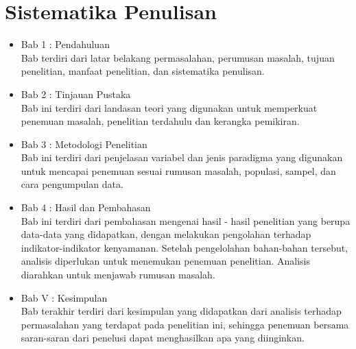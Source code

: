 \documentclass[12pt,oneside]{udthesis}\usepackage[]{graphicx}\usepackage[]{color}
\begin{document}
\section{Sistematika Penulisan}
\lipsum[1-1]
\begin{itemize}
	\item Bab 1 : Pendahuluan\\
Bab terdiri dari latar belakang permasalahan, perumusan masalah, tujuan penelitian, manfaat penelitian, dan sistematika penulisan.
	\item Bab 2 : Tinjauan Pustaka\\
Bab ini terdiri dari landasan teori yang digunakan untuk memperkuat penemuan masalah, penelitian terdahulu dan kerangka pemikiran.
	\item Bab 3 : Metodologi Penelitian\\
Bab ini terdiri dari penjelasan variabel dan jenis paradigma yang digunakan untuk mencapai penemuan sesuai rumusan masalah, populasi, sampel, dan cara pengumpulan data.
	\item Bab 4 : Hasil dan Pembahasan\\
Bab ini terdiri dari pembahasan mengenai hasil - hasil penelitian yang berupa data-data yang didapatkan, dengan melakukan pengolahan terhadap indikator-indikator kenyamanan. Setelah pengelolahan bahan-bahan tersebut, analisis diperlukan untuk menemukan penemuan penelitian. Analisis diarahkan untuk menjawab rumusan masalah.
	\item Bab V : Kesimpulan\\
Bab terakhir terdiri dari kesimpulan yang didapatkan dari analisis terhadap permasalahan yang terdapat pada penelitian ini, sehingga penemuan bersama saran-saran dari penelusi dapat menghasilkan apa yang diinginkan.


\end{itemize}
\end{document}
